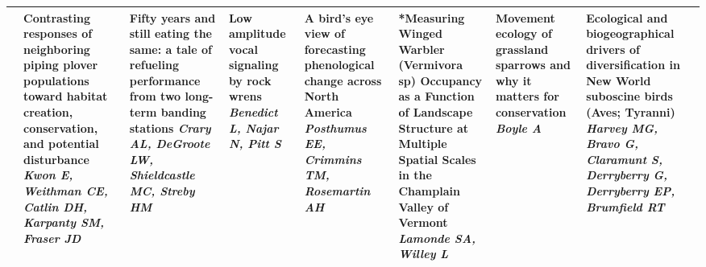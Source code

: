 \begin{tabular}{|x{0.85cm}|x{2.85cm}|x{2.85cm}|x{2.85cm}|x{2.85cm}|x{2.85cm}|a{2.85cm}|a{2.85cm}|}
&Contrasting responses of neighboring piping plover populations toward habitat creation, conservation, and potential disturbance \newline \newline \textit{Kwon E, Weithman CE, Catlin DH, Karpanty SM, Fraser JD} & Fifty years and still eating the same: a tale of refueling performance from two long-term banding stations \newline \newline \textit{Crary AL, DeGroote LW, Shieldcastle MC, Streby HM} & Low amplitude vocal signaling by rock wrens \newline \newline \textit{Benedict L, Najar N, Pitt S} & A bird's eye view of forecasting phenological change across North America \newline \newline \textit{Posthumus EE, Crimmins TM, Rosemartin AH} & *Measuring Winged Warbler (Vermivora sp) Occupancy as a Function of Landscape Structure at Multiple Spatial Scales in the Champlain Valley of Vermont \newline \newline \textit{Lamonde SA, Willey L} & Movement ecology of grassland sparrows and why it matters for conservation \newline \newline \textit{Boyle A} & Ecological and biogeographical drivers of diversification in New World suboscine birds (Aves; Tyranni) \newline \newline \textit{Harvey MG, Bravo G, Claramunt S, Derryberry G, Derryberry EP, Brumfield RT}\\
\hline

\end{tabular}
